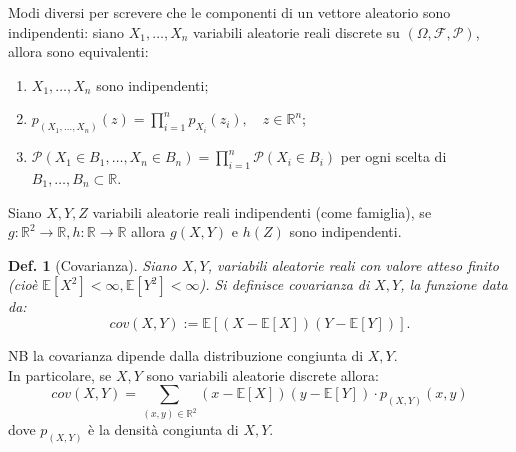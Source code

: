 \documentclass{article}
\newtheorem{definition}{Def.}[section]
\begin{document}
Modi diversi per screvere che le componenti di un vettore aleatorio sono
indipendenti: siano $X_1, \dots, X_n$ variabili aleatorie reali discrete su 
$(\Omega, \mathcal{F, P})$, allora sono equivalenti:
\begin{enumerate}
	\item $X_1, \dots, X_n$ sono indipendenti;

	\item $p_{(X_1, \dots, X_n)}(z) = \prod_{i = 1}^n p_{X_i}(z_i), \quad z \in
			\mathbb{R}^n$;
	
	\item $
			\mathcal{P}(X_1 \in B_1, \dots, X_n \in B_n) = \prod_{i = 1}^n
			\mathcal{P}(X_i \in B_i) $
		per ogni scelta di $B_1, \dots, B_n \subset \mathbb{R}$.
\end{enumerate}

Siano $X, Y, Z$ variabili aleatorie reali indipendenti (come famiglia), se $g:
\mathbb{R}^2 \to \mathbb{R}, h: \mathbb{R} \to \mathbb{R}$ allora $g(X, Y)$ e
$h(Z)$ sono indipendenti.

\begin{definition}[Covarianza]
	Siano $X, Y$, variabili aleatorie reali con valore atteso finito (cioè
	$\mathbb{E}[X^2] < \infty, \mathbb{E}[Y^2] < \infty$). Si definisce covarianza
	di $X, Y$, la funzione data da:
	\begin{equation}
		cov(X, Y) := \mathbb{E}[(X - \mathbb{E}[X])(Y - \mathbb{E}[Y])].
	\end{equation}
\end{definition}
NB la covarianza dipende dalla distribuzione congiunta di $X, Y$.\\
In particolare, se $X, Y$ sono variabili aleatorie discrete allora:
\begin{equation*}
	cov(X, Y) = \sum_{(x, y) \in \mathbb{R}^2} (x - \mathbb{E}[X])(y - \mathbb{E}[Y])
	\cdot p_{(X, Y)}(x, y)
\end{equation*}
dove $p_{(X, Y)}$ è la densità congiunta di $X, Y$.\\
\end{document}
